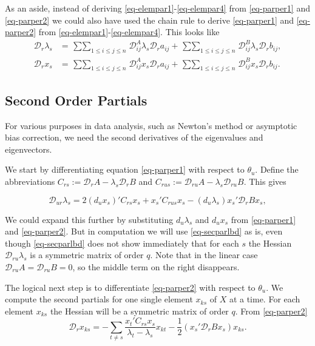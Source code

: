 \documentclass[
  12pt,
  letterpaper,
  DIV=11,
  numbers=noendperiod]{scrartcl}
\begin{document}
As an aside, instead of deriving \eqref{eq-elempar1}-\eqref{eq-elempar4}
from \eqref{eq-parper1} and \eqref{eq-parper2} we could also have used
the chain rule to derive \eqref{eq-parper1} and \eqref{eq-parper2} from
\eqref{eq-elempar1}-\eqref{eq-elempar4}. This looks like
\begin{subequations}
\begin{align}
\mathcal{D}_r\lambda_s&=\mathop{\sum\sum}_{1\leq i\leq j\leq n}\mathcal{D}_{ij}^A\lambda_s\mathcal{D}_ra_{ij}+\mathop{\sum\sum}_{1\leq i\leq j\leq n}\mathcal{D}_{ij}^B\lambda_s\mathcal{D}_rb_{ij},\label{eq-elemchain1}\\
\mathcal{D}_rx_s&=\mathop{\sum\sum}_{1\leq i\leq j\leq n}\mathcal{D}_{ij}^Ax_s\mathcal{D}_ra_{ij}+\mathop{\sum\sum}_{1\leq i\leq j\leq n}\mathcal{D}_{ij}^Bx_s\mathcal{D}_rb_{ij}.\label{eq-elemchain2}
\end{align}
\end{subequations}

\subsection{Second Order Partials}\label{sec-second}

For various purposes in data analysis, such as Newton's method or
asymptotic bias correction, we need the second derivatives of the
eigenvalues and eigenvectors.

We start by differentiating equation \eqref{eq-parper1} with respect to
\(\theta_u\). Define the abbreviations
\(C_{rs}:=\mathcal{D}_rA-\lambda_s\mathcal{D}_rB\) and
\(C_{rus}:=\mathcal{D}_{ru}A-\lambda_s\mathcal{D}_{ru}B\). This gives

\begin{equation}
\mathcal{D}_{ur}\lambda_s=2(d_ux_s)'C_{rs}x_s+
x_s'C_{rus}x_s-(d_u\lambda_s)x_s'\mathcal{D}_rBx_s,
\label{eq-secparlbd}
\end{equation}

We could expand this further by substituting \(d_u\lambda_s\) and
\(d_ux_s\) from \eqref{eq-parper1} and \eqref{eq-parper2}. But in
computation we will use \eqref{eq-secparlbd} as is, even though
\eqref{eq-secparlbd} does not show immediately that for each \(s\) the
Hessian \(\mathcal{D}_{ru}\lambda_s\) is a symmetric matrix of order
\(q\). Note that in the linear case
\(\mathcal{D}_{ru}A=\mathcal{D}_{ru}B=0\), so the middle term on the
right disappears.

The logical next step is to differentiate \eqref{eq-parper2} with
respect to \(\theta_u\). We compute the second partials for one single
element \(x_{ks}\) of \(X\) at a time. For each element \(x_{ks}\) the
Hessian will be a symmetric matrix of order \(q\). From
\eqref{eq-parper2} \begin{equation}
\mathcal{D}_rx_{ks}=-\sum_{t\not= s}\frac{x_t'C_{rs}x_s}{\lambda_t-\lambda_s}x_{kt}-\frac12(x_s'\mathcal{D}_rBx_s)x_{ks}.\label{eq-parper3}
\end{equation}
\end{document}
